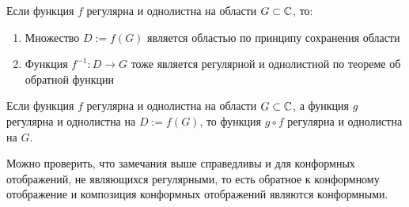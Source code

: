 \begin{note}
	Если функция $f$ регулярна и однолистна на области $G \subset \mathbb{C}$, то:
	\begin{enumerate}
		\item Множество $D := f(G)$ является областью по принципу сохранения области
		\item Функция $f^{-1} : D \to G$ тоже является регулярной и однолистной по теореме об обратной функции
	\end{enumerate}
\end{note}

\begin{note}
	Если функция $f$ регулярна и однолистна на области $G \subset \mathbb{C}$, а функция $g$ регулярна и однолистна на $D := f(G)$, то функция $g \circ f$ регулярна и однолистна на $G$.
\end{note}

\begin{note}
	Можно проверить, что замечания выше справедливы и для конформных отображений, не являющихся регулярными, то есть обратное к конформному отображение и композиция конформных отображений являются конформными.
\end{note}

